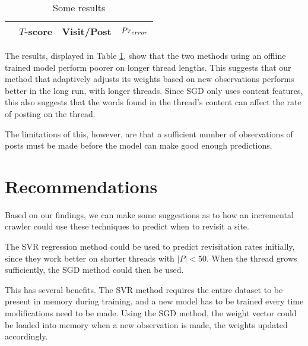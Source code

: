 \begin{table}
	\footnotesize
\begin{center}
\begin{tabular}{| l | c | c | c|}
\hline
& $T$-score			   &	Visit/Post & 	$Pr_{error}$ \\
\hline
	
\hline
	
\hline
	
\hline
	
\hline
	
\hline
\end{tabular}
\end{center}
\caption{Some results}\label{tbl:bin_eval}
\end{table}
The results, displayed in Table \ref{tbl:bin_eval}, show that the two methods 
using an offline trained model perform poorer on longer thread lengths. This 
suggests that our method that adaptively adjusts its weights based on new 
observations performs better in the long run, with longer threads. Since SGD 
only uses content features, this also suggests that the words found in the 
thread's content can affect the rate of posting on the thread.

The limitations of this, however, are that a sufficient number of observations 
of posts must be made before the model can make good enough predictions.

\section{Recommendations}
Based on our findings, we can make some suggestions as to how an incremental 
crawler could use these techniques to predict when to revisit a site.

The SVR regression method could be used to predict revisitation rates initially, 
since they work better on shorter threads with $|P| < 50$. When the thread grows 
sufficiently, the SGD method could then be used.

This has several benefits. The SVR method requires the entire dataset to be 
present in memory during training, and a new model has to be trained every time 
modifications need to be made.  Using the SGD method, the weight vector could be 
loaded into memory when a new observation is made, the weights updated 
accordingly.
